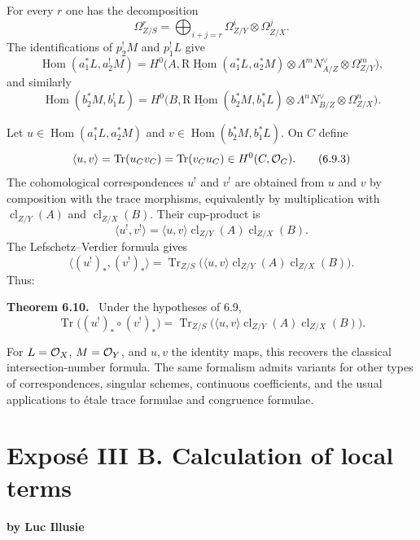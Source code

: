 \documentclass[11pt]{article}
\theoremstyle{plain}
\theoremstyle{definition}
\theoremstyle{remark}
\newenvironment{statement}[1]{\par\medskip\noindent\textbf{#1.}\ }{\par\medskip}
\DeclareMathOperator{\Hom}{Hom}
\DeclareMathOperator{\Tr}{Tr}
\DeclareMathOperator{\cl}{cl}
\newcommand{\R}{\mathrm R}
\begin{document}
For every $r$ one has the decomposition
\begin{equation}
   \Omega^r_{Z/S}=\bigoplus_{i+j=r}\Omega^i_{Z/Y}\otimes\Omega^j_{Z/X}.
   \tag{6.9.0}
\end{equation}
The identifications of $p_2^!M$ and $p_1^!L$ give
\begin{equation}
\Hom(a_1^*L,a_2^!M)=
H^0\bigl(A,\underline{\R\Hom}(a_1^*L,a_2^*M)\otimes
\Lambda^mN_{A/Z}^{\vee}\otimes\Omega^m_{Z/Y}\bigr),
\tag{6.9.1}
\end{equation}
and similarly
\begin{equation}
\Hom(b_2^*M,b_1^!L)=
H^0\bigl(B,\underline{\R\Hom}(b_2^*M,b_1^*L)\otimes
\Lambda^nN_{B/Z}^{\vee}\otimes\Omega^n_{Z/X}\bigr).
\tag{6.9.2}
\end{equation}

Let $u\in\Hom(a_1^*L,a_2^*M)$ and $v\in\Hom(b_2^*M,b_1^*L)$. On $C$ define
\begin{equation}
   \langle u,v\rangle=\Tr(u_Cv_C)=\Tr(v_Cu_C)\in H^0(C,\cO_C).
   \tag{6.9.3}
\end{equation}
The cohomological correspondences $u^!$ and $v^!$ are obtained from $u$ and $v$ by composition with the trace morphisms, equivalently by multiplication with $\cl_{Z/Y}(A)$ and $\cl_{Z/X}(B)$. Their cup-product is
\begin{equation}
   \langle u^!,v^!\rangle=
   \langle u,v\rangle\cl_{Z/Y}(A)\cl_{Z/X}(B).
   \tag{6.9.4}
\end{equation}
The Lefschetz--Verdier formula gives
\begin{equation}
   \langle (u^!)_*,(v^!)_*\rangle=
   \Tr_{Z/S}\bigl(\langle u,v\rangle\cl_{Z/Y}(A)\cl_{Z/X}(B)\bigr).
   \tag{6.9.5}
\end{equation}
Thus:

\begin{statement}{Theorem 6.10}
Under the hypotheses of 6.9,
\[
   \Tr\bigl((u^!)_*\circ (v^!)_*\bigr)=
   \Tr_{Z/S}\bigl(\langle u,v\rangle\cl_{Z/Y}(A)\cl_{Z/X}(B)\bigr).
\]
\end{statement}

For $L=\mathcal O_X$, $M=\mathcal O_Y$, and $u,v$ the identity maps, this recovers the classical intersection-number formula. The same formalism admits variants for other types of correspondences, singular schemes, continuous coefficients, and the usual applications to étale trace formulae and congruence formulae.

\section*{Exposé III B. Calculation of local terms}
\begin{center}
{\large\bfseries by Luc Illusie}
\end{center}
\end{document}
